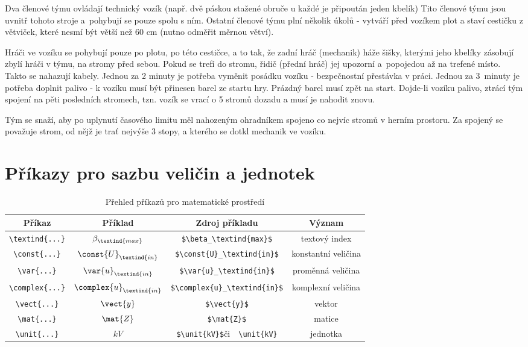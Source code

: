 Dva členové týmu ovládají technický vozík (např. dvě páskou stažené obruče u každé je připoután jeden kbelík) Tito členové týmu jsou uvnitř tohoto stroje a~pohybují se pouze spolu s ním. Ostatní členové týmu plní několik úkolů - vytváří 
před vozíkem plot a staví cestičku z větviček, které nesmí být větší než 60 cm (nutno odměřit měrnou větví). 

Hráči ve vozíku se pohybují pouze po plotu, po této cestičce, a to tak, že zadní hráč (mechanik) háže šišky, kterými jeho kbelíky zásobují zbylí hráči v týmu, na stromy před sebou. Pokud se trefí do stromu, řidič (přední hráč) jej upozorní 
a~popojedou až na trefené místo. Takto se nahazují kabely. Jednou za 2 minuty je potřeba vyměnit posádku vozíku - bezpečnostní přestávka v práci. Jednou za 3~minuty je potřeba doplnit palivo - k vozíku musí být přinesen barel ze startu 
hry. Prázdný barel musí zpět na start. Dojde-li vozíku palivo, ztrácí tým spojení na pěti posledních stromech, tzn. vozík se vrací o 5 stromů dozadu a musí je nahodit znovu.

Tým se snaží, aby po uplynutí časového limitu měl nahozeným ohradníkem spojeno co nejvíc stromů v herním prostoru. Za spojený se považuje strom, od nějž je trať nejvýše 3 stopy, a kterého se dotkl mechanik ve vozíku. 

\iffalse
\section{Příkazy pro sazbu veličin a jednotek}

\begin{table}[!h]
  \caption[Přehled příkazů]{Přehled příkazů pro matematické prostředí }
  \begin{center}
  	\small
	  \begin{tabular}{|c|c|c|c|}
	    \hline
	    Příkaz    						& Příklad 					& Zdroj příkladu  							& Význam  \\
	    \hline\hline
	    \verb|\textind{...}|	& $\beta_\textind{max}$ 	& \verb|$\beta_\textind{max}$|	& textový index \\
	    \hline
	    \verb|\const{...}| 		& $\const{U}_\textind{in}$ 				& \verb|$\const{U}_\textind{in}$|		& konstantní veličina \\
	    \hline
	    \verb|\var{...}| 		& $\var{u}_\textind{in}$ & \verb|$\var{u}_\textind{in}$| & proměnná veličina \\
	    \hline
	    \verb|\complex{...}| 	& $\complex{u}_\textind{in}$ & \verb|$\complex{u}_\textind{in}$| & komplexní veličina \\
	    \hline
	    \verb|\vect{...}| 		& $\vect{y}$ 						& \verb|$\vect{y}$| & vektor \\
	    \hline
	    \verb|\mat{...}| 	& $\mat{Z}$ 						& \verb|$\mat{Z}$| & matice \\
	    \hline
	    \verb|\unit{...}| 		& $\unit{kV}$ 						& \verb|$\unit{kV}$|\quad či\ \, \verb|\unit{kV}| & jednotka \\
	    \hline
	  \end{tabular}
  \end{center}
\end{table}



